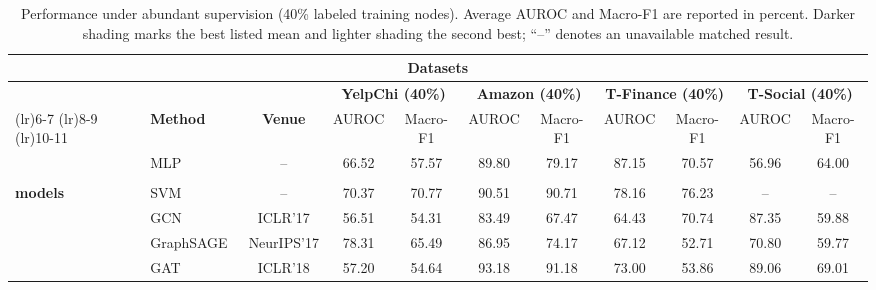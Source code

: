 \documentclass[10pt,journal]{IEEEtran}
\newcommand{\na}{--}
\begin{document}
\begin{table}[!t]
\centering
\caption{Performance under abundant supervision (40\% labeled training nodes).
Average AUROC and Macro-F1 are reported in percent. Darker shading marks the best listed mean and lighter shading the second best;
``--'' denotes an unavailable matched result.}
\label{tab:abundant}

\fontsize{7.2}{8.2}\selectfont
\setlength{\tabcolsep}{4.6pt}
\renewcommand{\arraystretch}{1.08}
\setlength{\aboverulesep}{0pt}
\setlength{\belowrulesep}{0pt}
\setlength{\extrarowheight}{1.15pt}
\renewcommand{\multirowsetup}{\centering}

\begin{tabular}{
>{\centering\arraybackslash}m{1.78cm}
l
c
*{8}{c}
}
\toprule

\multicolumn{3}{c}{} &
\multicolumn{8}{c}{\textbf{Datasets}} \\
\cmidrule(lr){4-11}

& & &
\multicolumn{2}{c}{\textbf{YelpChi (40\%)}} &
\multicolumn{2}{c}{\textbf{Amazon (40\%)}} &
\multicolumn{2}{c}{\textbf{T-Finance (40\%)}} &
\multicolumn{2}{c}{\textbf{T-Social (40\%)}} \\
\cmidrule(lr){4-5}
\cmidrule(lr){6-7}
\cmidrule(lr){8-9}
\cmidrule(lr){10-11}

\multirow{-2}{=}{\textbf{Category}} &
\multirow{-2}{*}{\textbf{Method}} &
\multirow{-2}{*}{\textbf{Venue}} &
AUROC & Macro-F1 &
AUROC & Macro-F1 &
AUROC & Macro-F1 &
AUROC & Macro-F1 \\
\midrule

& MLP~\cite{rumelhart1986learning} & -- &
66.52 & 57.57 &
89.80 & 79.17 &
87.15 & 70.57 &
56.96 & 64.00 \\
\multirow{-2}{=}{\makecell[c]{\textbf{Non-graph}\\\textbf{models}}}
& SVM~\cite{cortes1995support} & -- &
70.37 & 70.77 &
90.51 & 90.71 &
78.16 & 76.23 &
\na & \na \\

\midrule

& GCN~\cite{kipf2017gcn} & ICLR'17 &
56.51 & 54.31 &
83.49 & 67.47 &
64.43 & 70.74 &
87.35 & 59.88 \\

& GraphSAGE~\cite{hamilton2017graphsage} & NeurIPS'17 &
78.31 & 65.49 &
86.95 & 74.17 &
67.12 & 52.71 &
70.80 & 59.77 \\

& GAT~\cite{velickovic2018gat} & ICLR'18 &
57.20 & 54.64 &
93.18 & 91.18 &
73.00 & 53.86 &
89.06 & 69.01 \\


\end{tabular}
\end{table}
\end{document}
